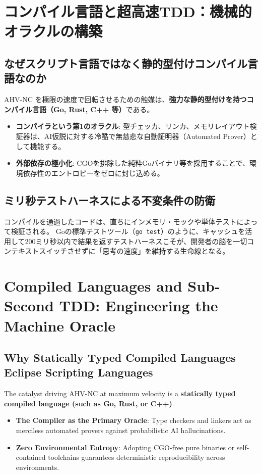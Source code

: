 \documentclass[11pt,a4paper,openany]{book}
\newif\ifja
\begin{document}
\ifja
  \chapter{コンパイル言語と超高速TDD：機械的オラクルの構築}
  \section{なぜスクリプト言語ではなく静的型付けコンパイル言語なのか}
  AHV-NC を極限の速度で回転させるための触媒は、\textbf{強力な静的型付けを持つコンパイル言語（Go, Rust, C++ 等）}である。

  \begin{itemize}
    \item \textbf{コンパイラという第1のオラクル}: 型チェッカ、リンカ、メモリレイアウト検証器は、AI仮説に対する冷酷で無慈悲な自動証明器（Automated Prover）として機能する。
    \item \textbf{外部依存の極小化}: CGOを排除した純粋Goバイナリ等を採用することで、環境依存性のエントロピーをゼロに封じ込める。
  \end{itemize}

  \section{ミリ秒テストハーネスによる不変条件の防衛}
  コンパイルを通過したコードは、直ちにインメモリ・モックや単体テストによって検証される。
  Goの標準テストツール（\texttt{go test}）のように、キャッシュを活用して200ミリ秒以内で結果を返すテストハーネスこそが、開発者の脳を一切コンテキストスイッチさせずに「思考の速度」を維持する生命線となる。
\else
  \chapter{Compiled Languages and Sub-Second TDD: Engineering the Machine Oracle}
  \section{Why Statically Typed Compiled Languages Eclipse Scripting Languages}
  The catalyst driving AHV-NC at maximum velocity is a \textbf{statically typed compiled language (such as Go, Rust, or C++)}.

  \begin{itemize}
    \item \textbf{The Compiler as the Primary Oracle}: Type checkers and linkers act as merciless automated provers against probabilistic AI hallucinations.
    \item \textbf{Zero Environmental Entropy}: Adopting CGO-free pure binaries or self-contained toolchains guarantees deterministic reproducibility across environments.
  \end{itemize}
\end{document}
